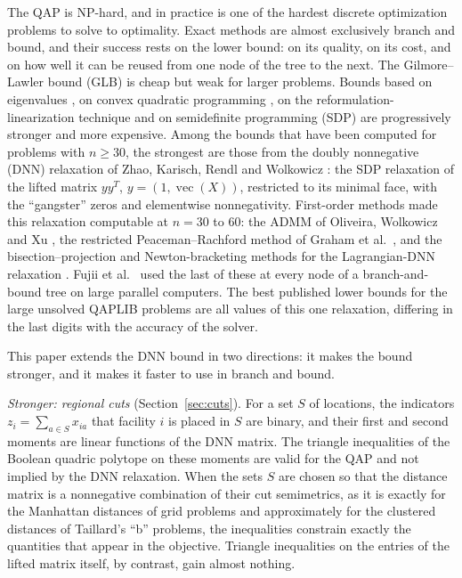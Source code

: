 \documentclass[11pt]{article}
\theoremstyle{remark}
\newcommand{\vecop}{\operatorname{vec}}
\begin{document}
The QAP is NP-hard, and in practice is one of the hardest discrete optimization
problems to solve to optimality. Exact methods are almost exclusively branch and
bound, and their success rests on the lower bound: on its quality, on its cost,
and on how well it can be reused from one node of the tree to the next. The
Gilmore--Lawler bound (GLB) \cite{gilmore,lawler} is cheap but weak for larger
problems. Bounds based on eigenvalues \cite{hrw}, on convex quadratic programming
\cite{ab01}, on the reformulation-linearization technique \cite{datenagi} and on
semidefinite programming (SDP) \cite{zkrw} are progressively stronger and more
expensive. Among the bounds that have been computed for problems with $n\ge30$,
the strongest are those from the doubly nonnegative (DNN) relaxation of Zhao,
Karisch, Rendl and Wolkowicz \cite{zkrw}: the SDP relaxation of the lifted matrix
$yy^T$, $y = (1,\vecop(X))$, restricted to its minimal face, with the ``gangster''
zeros and elementwise nonnegativity. First-order methods made this relaxation
computable at $n = 30$ to $60$: the ADMM of Oliveira, Wolkowicz and Xu \cite{owx},
the restricted Peaceman--Rachford method of Graham et al.\ \cite{graham}, and the
bisection--projection and Newton-bracketing methods for the Lagrangian-DNN
relaxation \cite{bbcpop,kkt}. Fujii et al.\ \cite{fujii} used the last of these
at every node of a branch-and-bound tree on large parallel computers. The best
published lower bounds for the large unsolved QAPLIB problems are all values of
this one relaxation, differing in the last digits with the accuracy of the solver.

This paper extends the DNN bound in two directions: it makes the bound stronger,
and it makes it faster to use in branch and bound.

\emph{Stronger: regional cuts} (Section~\ref{sec:cuts}). For a set $S$ of
locations, the indicators $z_i = \sum_{a\in S}x_{ia}$ that facility $i$ is placed
in $S$ are binary, and their first and second moments are linear functions of
the DNN matrix. The triangle inequalities of the Boolean quadric polytope
\cite{padberg} on these moments are valid for the QAP and not implied by the DNN
relaxation. When the sets $S$ are chosen so that the distance matrix is a
nonnegative combination of their cut semimetrics, as it is exactly for the
Manhattan distances of grid problems and approximately for the clustered
distances of Taillard's ``b'' problems, the inequalities constrain exactly the
quantities that appear in the objective. Triangle inequalities on the entries of
the lifted matrix itself, by contrast, gain almost nothing.
\end{document}
